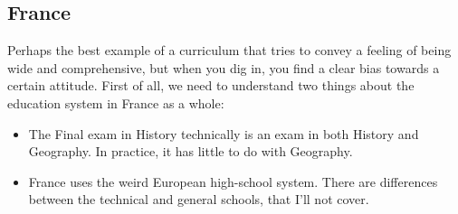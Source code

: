 \documentclass[12pt]{article}
\begin{document}
	\subsection{France}
	Perhaps the best example of a curriculum that tries to convey a feeling of being wide and comprehensive, but when you dig in, you find a clear bias towards a certain attitude. First of all, we need to understand two things about the education system in France as a whole: 
	\begin{itemize}
		\item The Final exam in History technically is an exam in both History and Geography. In practice, it has little to do with Geography. 
		\item France uses the weird European high-school system. There are differences between the technical and general schools, that I'll not cover. 
	\end{itemize}
	
\end{document}
